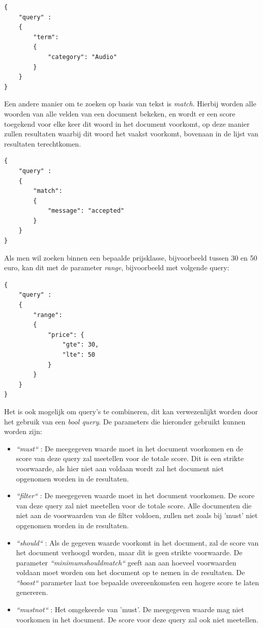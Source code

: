 \begin{lstlisting}[caption={Tekst-gebaseerd zoeken: Query om een simpele zoekopdracht uit te voeren waar de categorie van het product overeen komt met 'Audio' }]
{
	"query" : 
	{
		"term": 
		{
			"category": "Audio"
		}
	}
}
\end{lstlisting}

Een andere manier om te zoeken op basis van tekst is \textit{match}. Hierbij worden alle woorden van alle velden van een document bekeken, en wordt er een score toegekend voor elke keer dit woord in het document voorkomt, op deze manier zullen resultaten waarbij dit woord het vaakst voorkomt, bovenaan in de lijst van resultaten terechtkomen. 
\newpage
\begin{lstlisting}[caption={Tekst-gebaseerd zoeken: Query die de resultaten sorteert op basis van hoe vaak het woord 'accepted' voorkomt in het veld 'message' van een document }]
{
	"query" : 
	{
		"match": 
		{
			"message": "accepted"
		}
	}
}
\end{lstlisting}

Als men wil zoeken binnen een bepaalde prijsklasse, bijvoorbeeld tussen 30 en 50 euro, kan dit met de parameter \textit{range}, bijvoorbeeld met volgende query:

\begin{lstlisting}[caption={Bereik zoeken: Een query om alle documenten op te halen waarbij het veld 'price' tussen 30 en 50 ligt}]
{
	"query" : 
	{
		"range": 
		{
			"price": {
				"gte": 30,
				"lte": 50
			}
		}
	}
}
\end{lstlisting}


Het is ook mogelijk om query's te combineren, dit kan verwezenlijkt worden door het gebruik van een \textit{bool query}. De parameters die hieronder gebruikt kunnen worden zijn:

\begin{itemize}
	\setlength\itemsep{1em}
	\item \textit{``must``} : De meegegeven waarde moet in het document voorkomen en de score van deze query zal meetellen voor de totale score. Dit is een strikte voorwaarde, als hier niet aan voldaan wordt zal het document niet opgenomen worden in de resultaten.	
	\item \textit{``filter``} : De meegegeven waarde moet in het document voorkomen. De score van deze query zal niet meetellen voor de totale score. Alle documenten die niet aan de voorwaarden van de filter voldoen, zullen net zoals bij 'must' niet opgenomen worden in de resultaten.	
	\item \textit{``should``} : Als de gegeven waarde voorkomt in het document, zal de score van het document verhoogd worden, maar dit is geen strikte voorwaarde. De parameter \textit{``minimum\textunderscore should\textunderscore match``} geeft aan aan hoeveel voorwaarden voldaan moet worden om het document op te nemen in de resultaten. De \textit{``boost``} parameter laat toe bepaalde overeenkomsten een hogere score te laten genereren.
	\item \textit{``must\textunderscore not``} : Het omgekeerde van 'must'. De meegegeven waarde mag niet voorkomen in het document. De score voor deze query zal ook niet meetellen. 
\end{itemize}

